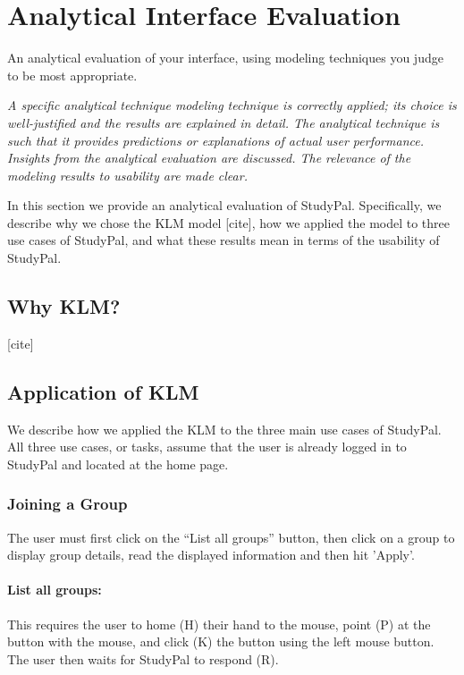 \documentclass[conference]{IEEEtran}
\begin{document}
\section{Analytical Interface Evaluation}
An analytical evaluation of your interface, using modeling techniques you judge to be most appropriate. 
 
\emph{A specific analytical technique modeling technique is correctly applied; its choice is well-justified and the results are explained in detail. The analytical technique is such that it provides predictions or explanations of actual user performance. Insights from the analytical evaluation are discussed. The relevance of the modeling results to usability are made clear.}

 
In this section we provide an analytical evaluation of StudyPal.
Specifically, we describe why we chose the KLM model [cite], how we applied the model to three use cases of StudyPal, and what these results mean in terms of the usability of StudyPal.

\subsection{Why KLM?}
[cite]


\subsection{Application of KLM}
We describe how we applied the KLM to the three main use cases of StudyPal.
All three use cases, or tasks, assume that the user is already logged in to StudyPal and located at the home page.

\subsubsection{Joining a Group}
The user must first click on the ``List all groups'' button, then click on a group to display group details, read the displayed information and then hit 'Apply'.

\paragraph{List all groups:}
This requires the user to home (H) their hand to the mouse, point (P) at the button with the mouse, and click (K) the button using the left mouse button.
The user then waits for StudyPal to respond (R).
\end{document}
